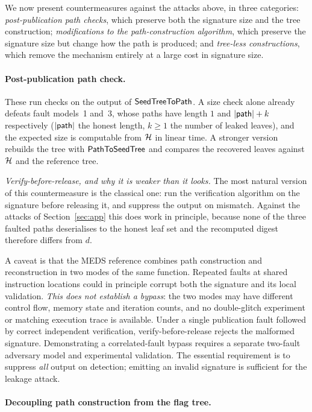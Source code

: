 We now present countermeasures against the attacks above, in three
categories: \emph{post-publication path checks},
which preserve both the signature size and the tree construction;
\emph{modifications to the path-construction algorithm}, which preserve the
signature size but change how the path is produced; and \emph{tree-less
constructions}, which remove the mechanism entirely at a large cost in
signature size.

\paragraph{Post-publication path check.}

These run checks on the output of $\mathsf{SeedTreeToPath}$. A size check alone already
defeats fault models~1 and~3, whose paths have length $1$ and $|\mathsf{path}|+k$
respectively ($|\mathsf{path}|$ the honest length, $k \geq 1$ the number of leaked
leaves), and the expected size is computable from $\mathcal{H}$ in linear time.
A stronger version rebuilds the tree with $\mathsf{PathToSeedTree}$ and compares the
recovered leaves against $\mathcal{H}$ and the reference tree.

\noindent\textit{Verify-before-release, and why it is weaker than it looks.}
The most natural version of this countermeasure is the classical one: run the
verification algorithm on the signature before releasing it, and suppress the
output on mismatch. Against the attacks of Section~\ref{sec:app} this does
work in principle, because none of the three faulted paths deserialises to the
honest leaf set and the recomputed digest therefore differs from $d$.

A caveat is that the MEDS reference combines path construction and
reconstruction in two modes of the same function. Repeated faults at shared
instruction locations could in principle corrupt both the signature and its
local validation. \emph{This does not establish a bypass}: the two modes
may have different control flow, memory state and iteration counts, and no
double-glitch experiment or matching execution trace is available. Under a
single publication fault followed by correct independent verification,
verify-before-release rejects the malformed signature. Demonstrating a
correlated-fault bypass requires a separate two-fault adversary model and
experimental validation. The essential requirement is to suppress \emph{all}
output on detection; emitting an invalid signature is sufficient for the
leakage attack.

\paragraph{Decoupling path construction from the flag tree.}

